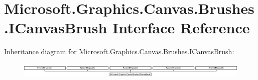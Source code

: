 \hypertarget{interface_microsoft_1_1_graphics_1_1_canvas_1_1_brushes_1_1_i_canvas_brush}{}\section{Microsoft.\+Graphics.\+Canvas.\+Brushes.\+I\+Canvas\+Brush Interface Reference}
\label{interface_microsoft_1_1_graphics_1_1_canvas_1_1_brushes_1_1_i_canvas_brush}
Inheritance diagram for Microsoft.\+Graphics.\+Canvas.\+Brushes.\+I\+Canvas\+Brush\+:\begin{figure}[H]
\begin{center}
\leavevmode
\includegraphics[height=0.727273cm]{interface_microsoft_1_1_graphics_1_1_canvas_1_1_brushes_1_1_i_canvas_brush}
\end{center}
\end{figure}
